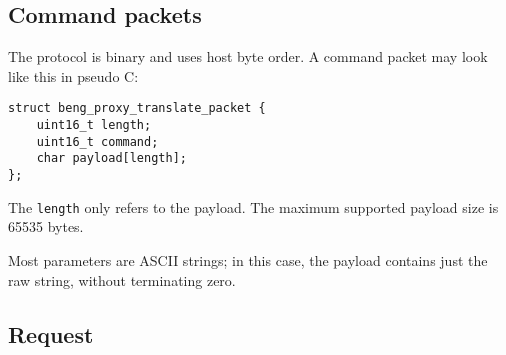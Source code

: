 \documentclass[a4paper,12pt]{article}
\begin{document}
\subsection{Command packets}

The protocol is binary and uses host byte order.  A command packet may
look like this in pseudo C:

\begin{verbatim}
struct beng_proxy_translate_packet {
    uint16_t length;
    uint16_t command;
    char payload[length];
};
\end{verbatim}

The \texttt{length} only refers to the payload.  The maximum supported
payload size is 65535 bytes.

Most parameters are ASCII strings; in this case, the payload contains
just the raw string, without terminating zero.

\subsection{Request}
\end{document}
